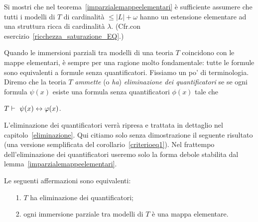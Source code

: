 \begin{exercise}\label{ex_imparzialemappeelementari}
Si mostri che nel teorema~\ref{imparzialemappeelementari} \`e sufficiente assumere che tutti i modelli di $T$ di cardinalit\`a $\le|L|+\omega$ hanno un estensione elementare ad una struttura ricca di cardinalit\`a $\lambda$. (Cfr.\@ con esercizio~\ref{ricchezza_saturazione_EQ}.)\QED
\end{exercise}

Quando le immersioni parziali tra modelli di una teoria $T$ coincidono con le mappe elementari, \`e sempre per una ragione molto fondamentale: tutte le formule sono equivalenti a formule senza quantificatori. 
%
% 
% 
%
Fissiamo un po' di terminologia. Diremo che la teoria $T$ \emph{ammette\/} (o \emph{ha\/}) \emph{eliminazione dei quantificatori} se se ogni formula $\psi(x)$ esiste una formula senza quantificatori $\phi(x)$ tale che 

\hfil$\displaystyle T\proves\ \psi(x)\iff\phi(x)$.

L'eliminazione dei quantificatori verr\`a ripresa e trattata in dettaglio nel capitolo~\ref{eliminazione}. Qui citiamo solo senza dimostrazione il seguente risultato (una versione semplificata del corollario~\ref{criterioeq1}). Nel frattempo dell'eliminazione dei quantificatori useremo solo la forma debole stabilita dal lemma~\ref{imparzialemappeelementari}.


\begin{theorem}\label{tutteleimmersionisonoelementari=eliminazioneqantificatori}
Le seguenti affermazioni sono equivalenti:
\begin{itemize}
\item[1.] $T$ ha eliminazione dei quantificatori;
\item[2.] ogni immersione parziale tra modelli di $T$ \`e una mappa elementare.\QED
\end{itemize}
\end{theorem}

